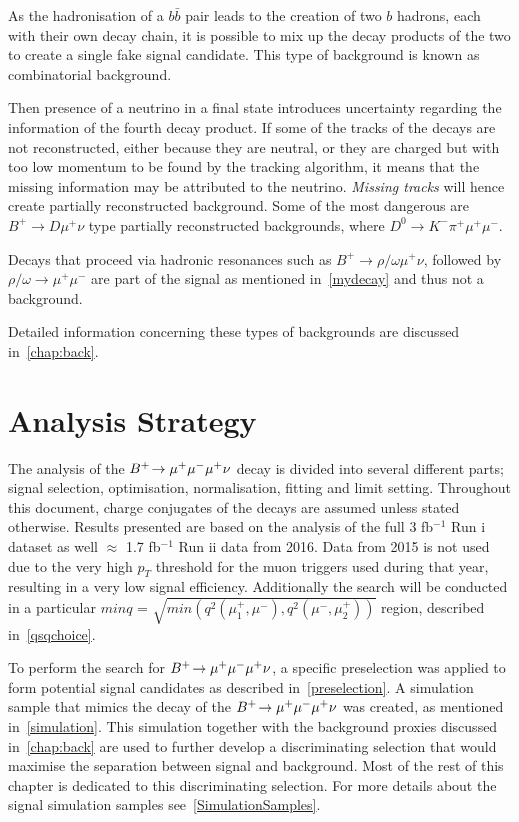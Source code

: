 As the hadronisation of a $b\bar{b}$ pair leads to the creation of two $b$ hadrons, each with their own decay chain, it is possible to mix up the decay products of the two to create a single fake signal candidate. This type of background is known as combinatorial background.

Then presence of a neutrino in a final state introduces uncertainty regarding the information of the fourth decay product. If some of the tracks of the decays are not reconstructed, either because they are neutral, or they are charged but with too low momentum to be found by the tracking algorithm, it means that the missing information may be attributed to the neutrino. \textit{Missing tracks} will hence create partially reconstructed background. Some of the most dangerous are ${B^{+} \rightarrow D \mu^{+} \nu}$ type partially reconstructed backgrounds, where $D^0 \rightarrow K^- \pi^+ \mu^{+} \mu^{-}$.

Decays that proceed via hadronic resonances such as $B^{+} \rightarrow \rho/\omega \mu^{+} \nu$, followed by $\rho/\omega \rightarrow \mu^{+} \mu^{-}$ are part of the signal as mentioned in~\autoref{mydecay} and thus not a background.

Detailed information concerning these types of backgrounds are discussed in~\autoref{chap:back}.

\section{Analysis Strategy}
\label{Strategy}

The analysis of the ${{{B}^+}}\!\rightarrow {\ensuremath{\mu^+\mu^-\mu^+}}\nu$ decay is divided into several different parts; signal selection, optimisation, normalisation, fitting and limit setting. Throughout this document, charge conjugates of the decays are assumed unless stated otherwise. Results presented are based on the analysis of the full 3 fb$^{-1}$ Run \Rn{1} dataset as well $\approx$ 1.7 fb$^{-1}$ Run \Rn{2} data from 2016. Data from 2015 is not used due to the very high $p_{T}$ threshold for the muon triggers used during that year, resulting in a very low signal efficiency. Additionally the search will be conducted in a particular $minq$ = $\sqrt{min(q^{2}(\mu_{1}^{+},\mu^{-}), q^2(\mu^{-},\mu_{2}^{+}))}$ region, described in~\autoref{qsqchoice}.  


To perform the search for ${{{B}^+}}\!\rightarrow {\ensuremath{\mu^+\mu^-\mu^+}}\nu$, a specific preselection was applied to form potential signal candidates as described in~\autoref{preselection}. A simulation sample that mimics the decay of the ${{{B}^+}}\!\rightarrow {\ensuremath{\mu^+\mu^-\mu^+}}\nu$ was created, as mentioned in~\autoref{simulation}. This simulation together with the background proxies discussed in~\autoref{chap:back} are used to further develop a discriminating selection that would maximise the separation between signal and background. Most of the rest of this chapter is dedicated to this discriminating selection. For more details about the signal simulation samples see~\autoref{SimulationSamples}.


